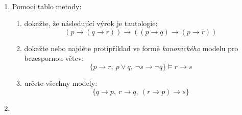 \documentclass[a4paper]{amsart}
\theoremstyle{definition}
\begin{document}
            \medskip\begin{ukol}[3 body]{\,}

                \begin{enumerate}[label=\arabic*.]
                \item Pomocí tablo metody:
                \begin{enumerate}
                    \item dokažte, že následující výrok je tautologie: 
                    $$(p \to (q \to r)) \to ((p\to q)\to (p \to r))$$
                    \item dokažte nebo najděte protipříklad ve formě \emph{kanonického} modelu pro bezespornou větev:
                    $$\{ p \to r,\ p \vee q,\ \neg s \to \neg q\} \models r \to s$$
                    \item určete všechny modely:
                    $$\{ q \to p,\ r \to q,\ (r \to p) \to s\}$$
                \end{enumerate}
                \item 
                \end{enumerate} 
                \end{ukol}
\end{document}
